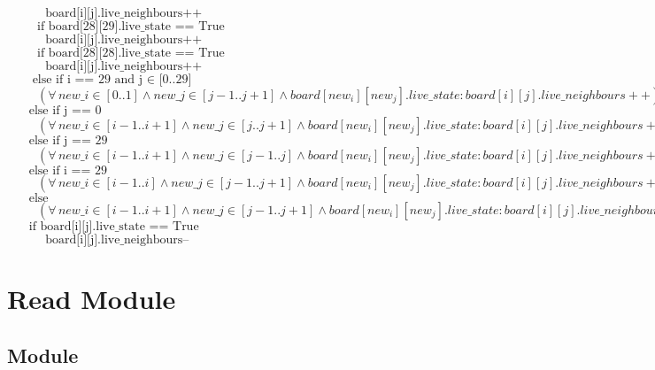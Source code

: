 \documentclass[12pt]{article}
\begin{document}
\begin{itemize}
$~~~~~~~~~~~~~~\text{board[i][j].live\_neighbours++}$\\
$~~~~~~~~~~~\text{if board[28][29].live\_state == True}$\\
$~~~~~~~~~~~~~~\text{board[i][j].live\_neighbours++}$\\
$~~~~~~~~~~~\text{if board[28][28].live\_state == True}$\\
$~~~~~~~~~~~~~~\text{board[i][j].live\_neighbours++}$\\
$~~~~~~~~\text{else if i == 29 and j $\in$ [0..29]}$\\
$~~~~~~~~~~~(\forall\, new\_i \in [0..1] \land new\_j \in [j-1..j+1] \land board[new_i][new_j].live\_state  : board[i][j].live\_neighbours++)$\\
$~~~~~~~~\text{else if j == 0}$\\
$~~~~~~~~~~~(\forall\, new\_i \in [i-1..i+1] \land new\_j \in [j..j+1] \land board[new_i][new_j].live\_state  : board[i][j].live\_neighbours++)$\\
$~~~~~~~~\text{else if j == 29}$\\
$~~~~~~~~~~~(\forall\, new\_i \in [i-1..i+1] \land new\_j \in [j-1..j] \land board[new_i][new_j].live\_state  : board[i][j].live\_neighbours++)$\\
$~~~~~~~~\text{else if i == 29}$\\
$~~~~~~~~~~~(\forall\, new\_i \in [i-1..i] \land new\_j \in [j-1..j+1] \land board[new_i][new_j].live\_state  : board[i][j].live\_neighbours++)$\\
$~~~~~~~~\text{else}$\\
$~~~~~~~~~~~(\forall\, new\_i \in [i-1..i+1] \land new\_j \in [j-1..j+1] \land board[new_i][new_j].live\_state  : board[i][j].live\_neighbours++)$\\
$~~~~~~~~\text{if board[i][j].live\_state == True}$\\
$~~~~~~~~~~~~~~\text{board[i][j].live\_neighbours--}$\\

\end{itemize}

\newpage

\section* {Read Module}

\subsection* {Module}
\end{document}
